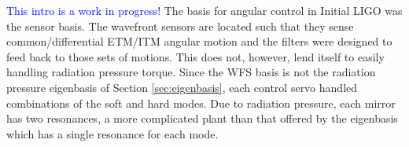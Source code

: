 








\textcolor{blue}{This intro is a work in progress!}
The basis for angular control in Initial LIGO was the sensor
basis. The wavefront sensors are located such that they sense
common/differential ETM/ITM angular motion and the filters were
designed to feed back to those sets of motions. This does not, however,
lend itself to easily handling radiation pressure torque. Since the
WFS basis is not the radiation pressure eigenbasis of Section
\ref{sec:eigenbasis}, each control servo handled combinations of the
soft and hard modes. Due to radiation pressure, each mirror has two
resonances, a more complicated plant than that offered by the
eigenbasis which has a single resonance for each mode.

